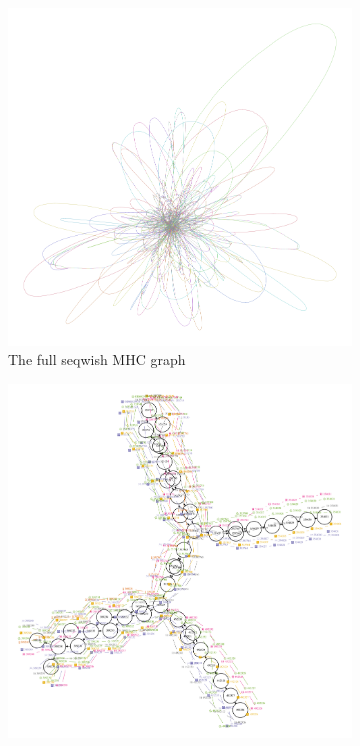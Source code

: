 \documentclass[a4paper,12pt,numbered,oneside]{Classes/PhDThesisPSnPDF}
\begin{document}
\begin{figure}[htbp!]
  \centering
  \begin{subfigure}[t]{0.49\textwidth}
    \includegraphics[width=1.0\textwidth]{Chapter3/Figs/seqwish_MHC.png}
    \caption{The full seqwish MHC graph}
    \label{subfig:seqwish_mhc_bandage}
  \end{subfigure}
  \begin{subfigure}[t]{0.49\textwidth}
    \includegraphics[width=1.0\textwidth]{Chapter3/Figs/seqwish_MHC_n353767_neato.pdf}

\end{subfigure}
\end{figure}
\end{document}
